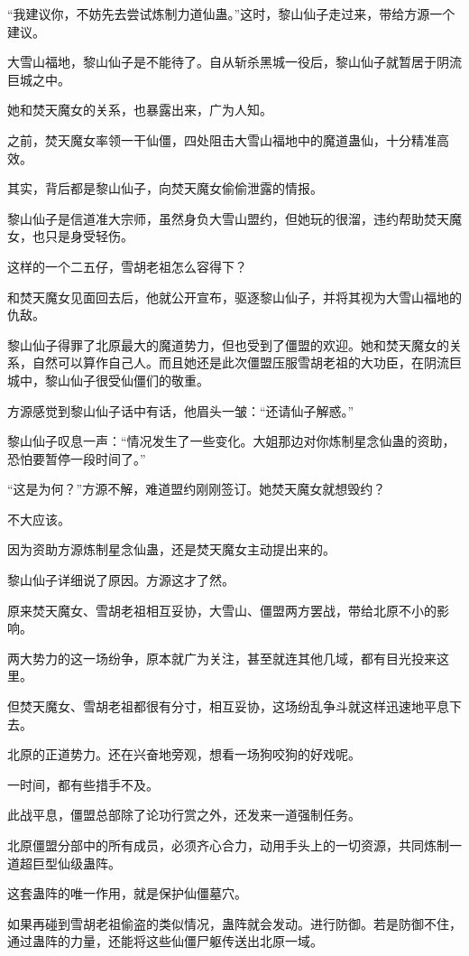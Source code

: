 \begin{this_body}
“我建议你，不妨先去尝试炼制力道仙蛊。”这时，黎山仙子走过来，带给方源一个建议。

大雪山福地，黎山仙子是不能待了。自从斩杀黑城一役后，黎山仙子就暂居于阴流巨城之中。

她和焚天魔女的关系，也暴露出来，广为人知。

之前，焚天魔女率领一干仙僵，四处阻击大雪山福地中的魔道蛊仙，十分精准高效。

其实，背后都是黎山仙子，向焚天魔女偷偷泄露的情报。

黎山仙子是信道准大宗师，虽然身负大雪山盟约，但她玩的很溜，违约帮助焚天魔女，也只是身受轻伤。

这样的一个二五仔，雪胡老祖怎么容得下？

和焚天魔女见面回去后，他就公开宣布，驱逐黎山仙子，并将其视为大雪山福地的仇敌。

黎山仙子得罪了北原最大的魔道势力，但也受到了僵盟的欢迎。她和焚天魔女的关系，自然可以算作自己人。而且她还是此次僵盟压服雪胡老祖的大功臣，在阴流巨城中，黎山仙子很受仙僵们的敬重。

方源感觉到黎山仙子话中有话，他眉头一皱：“还请仙子解惑。”

黎山仙子叹息一声：“情况发生了一些变化。大姐那边对你炼制星念仙蛊的资助，恐怕要暂停一段时间了。”

“这是为何？”方源不解，难道盟约刚刚签订。她焚天魔女就想毁约？

不大应该。

因为资助方源炼制星念仙蛊，还是焚天魔女主动提出来的。

黎山仙子详细说了原因。方源这才了然。

原来焚天魔女、雪胡老祖相互妥协，大雪山、僵盟两方罢战，带给北原不小的影响。

两大势力的这一场纷争，原本就广为关注，甚至就连其他几域，都有目光投来这里。

但焚天魔女、雪胡老祖都很有分寸，相互妥协，这场纷乱争斗就这样迅速地平息下去。

北原的正道势力。还在兴奋地旁观，想看一场狗咬狗的好戏呢。

一时间，都有些措手不及。

此战平息，僵盟总部除了论功行赏之外，还发来一道强制任务。

北原僵盟分部中的所有成员，必须齐心合力，动用手头上的一切资源，共同炼制一道超巨型仙级蛊阵。

这套蛊阵的唯一作用，就是保护仙僵墓穴。

如果再碰到雪胡老祖偷盗的类似情况，蛊阵就会发动。进行防御。若是防御不住，通过蛊阵的力量，还能将这些仙僵尸躯传送出北原一域。


\end{this_body}

